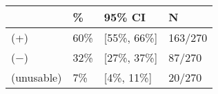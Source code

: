 \begin{tabular}{llll}
\hline
& \% & 95\% CI  & N \\
\hline
(+) & 60\% & [55\%, 66\%] & 163/270\\
($-$) & 32\% & [27\%, 37\%] & 87/270\\
(unusable) & 7\% & [4\%, 11\%] & 20/270\\
\hline
\end{tabular}
